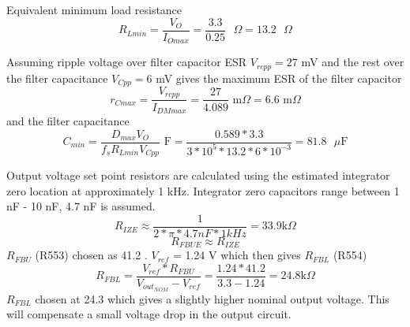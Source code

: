 Equivalent minimum load resistance
\begin{equation}
R_{Lmin}=\frac{V_O}{I_{Omax}} = \frac{3.3}{0.25} \text{ $\Omega$} =
13.2 \text{ $\Omega$}
\end{equation}

Assuming ripple voltage over filter capacitor ESR $V_{rcpp}=27$ mV and
the rest over the filter capacitance $V_{Cpp}=6$ mV gives the maximum
ESR of the filter capacitor
\begin{equation}
r_{Cmax} = \frac{V_{rcpp}}{I_{DMmax}} =
\frac{27}{4.089} \text{ m$\Omega$} = 6.6 \text{ m$\Omega$}
\end{equation}
and the filter capacitance
\begin{equation}
C_{min} = \frac{D_{max}V_O}{f_sR_{Lmin}V_{Cpp}} \text{ F} =
\frac{0.589*3.3}{3*10^5*13.2*6*10^{-3}} = 81.8 \text{ $\mu$F}
\end{equation}


Output voltage set point resistors are calculated using the estimated
integrator zero location at approximately 1 kHz. Integrator zero
capacitors range between 1 nF - 10 nF, 4.7 nF is assumed.
\begin{equation}
R_{IZE} \approx \frac{1}{2* \pi * 4.7 nF * 1 kHz} =
33.9 \text{k$\Omega$}
\end{equation}
\begin{equation}
R_{FBUE} \approx R_{IZE}
\end{equation}
$R_{FBU}$ (R553) chosen as 41.2 . $V_{ref}$ = 1.24 V
which then gives $R_{FBL}$ (R554)
\begin{equation}
R_{FBL} = \frac{V_{ref}*R_{FBU}}{V_{out_{NOM}} - V_{ref}}
= \frac{1.24*41.2}{3.3-1.24} = 24.8 \text{k$\Omega$}
\end{equation}
$R_{FBL}$ chosen at 24.3  which gives a slightly
higher nominal output voltage. This will compensate a small voltage drop
in the output circuit.

